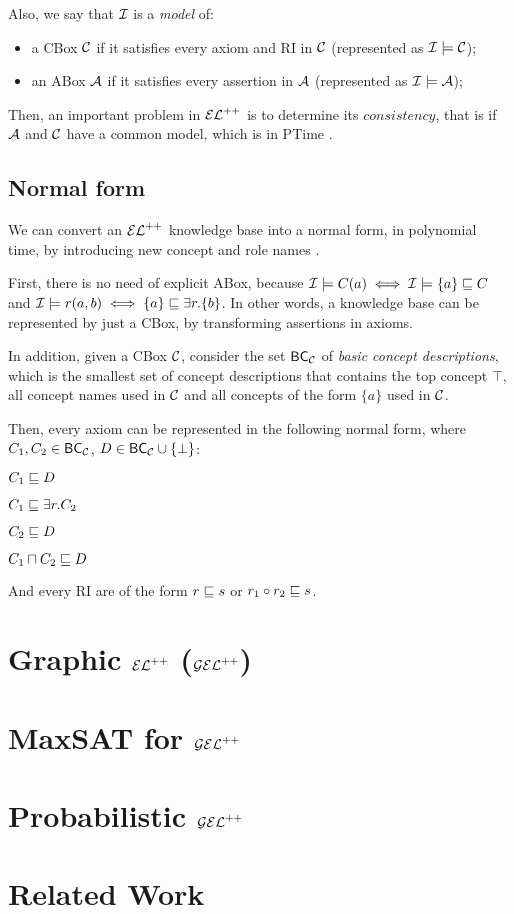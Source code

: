 Also, we say that $\mathcal{I}$ is a \emph{model} of:
\begin{itemize}
  \item a CBox $\mathcal{C}$ if it satisfies every axiom and RI in $\mathcal{C}$ (represented as $\mathcal{I} \models \mathcal{C}$);
  \item an ABox $\mathcal{A}$ if it satisfies every assertion in $\mathcal{A}$ (represented as $\mathcal{I} \models \mathcal{A}$);
\end{itemize}

Then, an important problem in $\mathcal{EL}^{++}$ is to determine its $consistency$, that is if $\mathcal{A}$ and $\mathcal{C}$ have a common model, which is in PTime \citep{Baader2005a}.

\subsection{Normal form}
We can convert an $\mathcal{EL}^{++}$ knowledge base into a normal form, in polynomial time, by introducing new concept and role names \citep{Baader2005a}.

First, there is no need of explicit ABox, because $\mathcal{I} \models C(a)\iff \mathcal{I} \models \{a\} \sqsubseteq C$ and $\mathcal{I} \models r(a, b) \iff \{a\} \sqsubseteq \exists r.\{b\}$. In other words, a knowledge base can be represented by just a CBox, by transforming assertions in axioms.  

In addition, given a CBox $\mathcal{C}$, consider the set $\mathsf{BC}_\mathcal{C}$ of \emph{basic concept descriptions}, which is the smallest set of concept descriptions that contains the top concept $\top$, all concept names used in $\mathcal{C}$ and all concepts of the form $\{a\}$ used in $\mathcal{C}$.

Then, every axiom can be represented in the following normal form, where $C_1, C_2 \in \mathsf{BC}_\mathcal{C}$, $D \in \mathsf{BC}_\mathcal{C} \cup \{\bot\}$:

\begin{enumerate*}[itemjoin = {\hskip 0.8in}]
  \item $C_1 \sqsubseteq D$
  \item $C_1 \sqsubseteq \exists r.C_2$
  \item $C_2 \sqsubseteq D$
  \item $C_1 \sqcap C_2 \sqsubseteq D$
\end{enumerate*}

And every RI are of the form $r \sqsubseteq s$ or $r_1 \circ r_2 \sqsubseteq s$.


\section{Graphic \texorpdfstring{$\mathcal{EL}^{++}$}{𝓔𝓛++} (\texorpdfstring{$\mathcal{GEL}^{++}$}{𝓖𝓔𝓛++})}

\section{MaxSAT for \texorpdfstring{$\mathcal{GEL}^{++}$}{𝓖𝓔𝓛++}}

\section{Probabilistic \texorpdfstring{$\mathcal{GEL}^{++}$}{𝓖𝓔𝓛++}}

\section{Related Work}